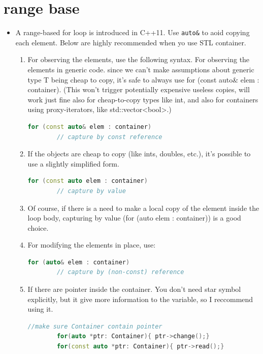 \documentclass[a4paper,11pt,twoside]{book}
\begin{document}
\section{range base}
\begin{itemize}
	
	\item A range-based for loop is introduced in C++11. Use \texttt{auto\&} to aoid copying each element. Below are highly recommended when yo use STL container.
	
	\begin{enumerate}
		\item For observing the elements, use the following syntax. For observing the elements in generic code. since we can't make assumptions about generic type T being cheap to copy, it's safe to always use for (const auto\& elem : container).
		(This won't trigger potentially expensive useless copies, will work just fine also for cheap-to-copy types like int, and also for containers using proxy-iterators, like std::vector<bool>.)
		\begin{lstlisting}[frame=single, language=c++]
		for (const auto& elem : container)    
		// capture by const reference
		\end{lstlisting}	
		
		
		\item If the objects are cheap to copy (like ints, doubles, etc.), it's possible to use a slightly simplified form. 
		
		\begin{lstlisting}[frame=single, language=c++]
		for (const auto elem : container)   
		// capture by value
		\end{lstlisting}            
		
		\item Of course, if there is a need to make a local copy of the element inside the loop body, capturing by value (for (auto elem : container)) is a good choice.
		
		\item For modifying the elements in place, use:
		\begin{lstlisting}[frame=single, language=c++]
		for (auto& elem : container)    
		// capture by (non-const) reference
		\end{lstlisting}
		
		
		
		\item If there are pointer inside the container. You don't need star symbol explicitly, but it give more information to the variable, so I reccommend using it.
		\begin{lstlisting}[frame=single, language=c++]
		//make sure Container contain pointer
		for(auto *ptr: Container){ ptr->change();}
		for(const auto *ptr: Container){ ptr->read();}
		\end{lstlisting}
		

\end{enumerate}
\end{itemize}
\end{document}
